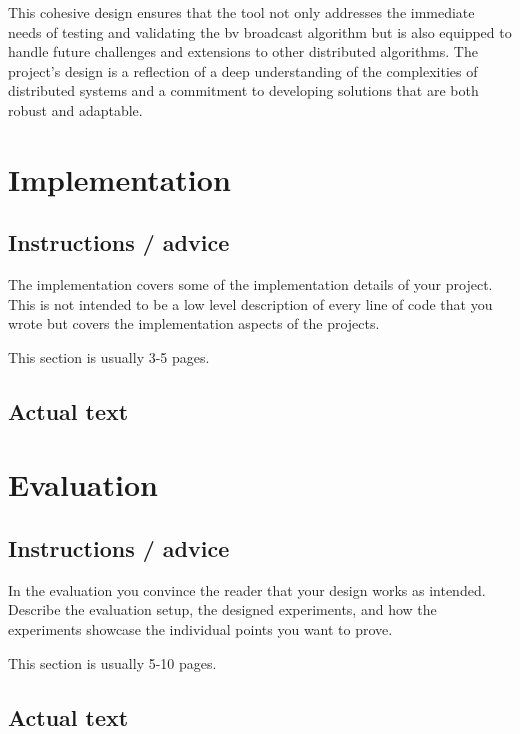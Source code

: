 \documentclass[a4paper,11pt,oneside]{report}
\begin{document}
This cohesive design ensures that the tool not only addresses the immediate needs of testing and validating the bv broadcast algorithm but is also equipped to handle future challenges and extensions to other distributed algorithms. The project's design is a reflection of a deep understanding of the complexities of distributed systems and a commitment to developing solutions that are both robust and adaptable.



\chapter{Implementation}

\section{Instructions / advice}
The implementation covers some of the implementation details of your project.
This is not intended to be a low level description of every line of code that
you wrote but covers the implementation aspects of the projects.

This section is usually 3-5 pages.

\section{Actual text}




\chapter{Evaluation}

\section{Instructions / advice}
In the evaluation you convince the reader that your design works as intended.
Describe the evaluation setup, the designed experiments, and how the
experiments showcase the individual points you want to prove.

This section is usually 5-10 pages.

\section{Actual text}
\end{document}
